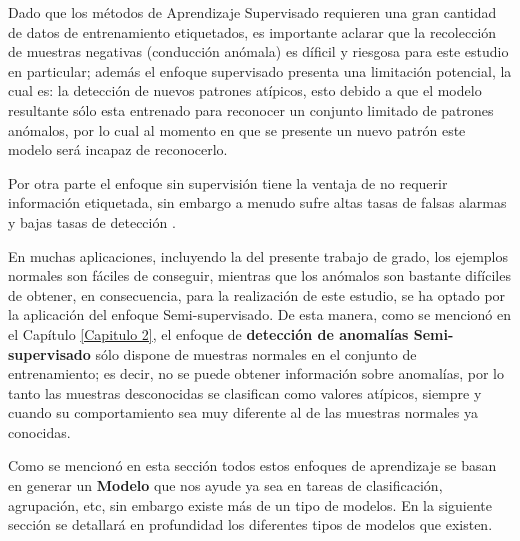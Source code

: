 \vspace{5mm} %

Dado que los m\'{e}todos de Aprendizaje Supervisado requieren una gran cantidad de datos de entrenamiento etiquetados, es importante aclarar que la recolecci\'{o}n de muestras negativas (conducci\'{o}n an\'{o}mala) es d\'{i}ficil y riesgosa para este estudio en particular; adem\'{a}s el enfoque supervisado presenta una limitaci\'{o}n potencial, la cual es: la detecci\'{o}n de nuevos patrones at\'{i}picos, esto debido a que el modelo resultante s\'{o}lo esta entrenado para reconocer un conjunto limitado de patrones an\'{o}malos, por lo cual al momento en que se presente un nuevo patr\'{o}n este modelo ser\'{a} incapaz de reconocerlo.

\vspace{5mm} %

Por otra parte el enfoque sin supervisi\'{o}n tiene la ventaja de no requerir informaci\'{o}n etiquetada, sin embargo a menudo sufre altas tasas de falsas alarmas y bajas tasas de detecci\'{o}n \cite{33}. 

\vspace{5mm} %

En muchas aplicaciones, incluyendo la del presente trabajo de grado, los ejemplos normales son f\'{a}ciles de conseguir, mientras que los an\'{o}malos son bastante dif\'{i}ciles de obtener, en consecuencia, para la realizaci\'{o}n de este estudio, se ha optado por la aplicaci\'{o}n del enfoque Semi-supervisado. De esta manera, como se mencion\'{o} en el Cap\'{i}tulo \ref{Capitulo 2}, el enfoque de \textbf{detecci\'{o}n de anomal\'{i}as Semi-supervisado} s\'{o}lo dispone de muestras normales en el conjunto de entrenamiento; es decir, no se puede obtener informaci\'{o}n sobre anomal\'{i}as, por lo tanto las muestras desconocidas se clasifican como valores at\'{i}picos, siempre y cuando su comportamiento sea muy diferente al de las muestras normales ya conocidas.

\vspace{5mm} %

Como se mencion\'{o} en esta secci\'{o}n todos estos enfoques de aprendizaje se basan en generar un \textbf{Modelo} que nos ayude ya sea en tareas de clasificaci\'{o}n, agrupaci\'{o}n, etc, sin embargo existe m\'{a}s de un tipo de modelos. En la siguiente secci\'{o}n se detallar\'{a} en profundidad los diferentes tipos de modelos que existen.


